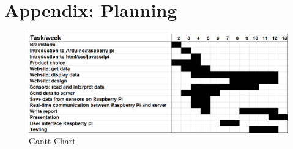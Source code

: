 \section{Appendix: Planning}
\begin{figure}[H]
  \center
  \includegraphics[width=1.5\linewidth, angle=90]{./appendix_planning/ganttchart2.png}
  \caption{Gantt Chart}
  \label{image:ganttchart}
\end{figure}
